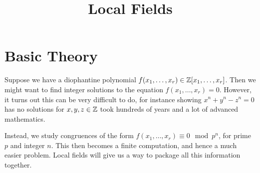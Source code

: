\documentclass[10pt,a4paper]{article}
\title{Local Fields}
\begin{document}
\maketitle

\section{Basic Theory}
Suppose we have a diophantine polynomial $f(x_1, \ldots, x_r) \in \mathbb{Z}[x_1, \ldots, x_r]$. Then we might want to find integer solutions to the equation $f(x_1, \ldots, x_r) = 0$. However, it turns out this can be very difficult to do, for instance showing $x^n + y^n - z^n = 0$ has no solutions for $x,y,z \in \mathbb{Z}$ took hundreds of years and a lot of advanced mathematics.

Instead, we study congruences of the form $f(x_1, \ldots, x_r) \equiv 0 \mod p^n$, for prime $p$ and integer $n$. This then becomes a finite computation, and hence a much easier problem. Local fields will give us a way to package all this information together.
\end{document}
